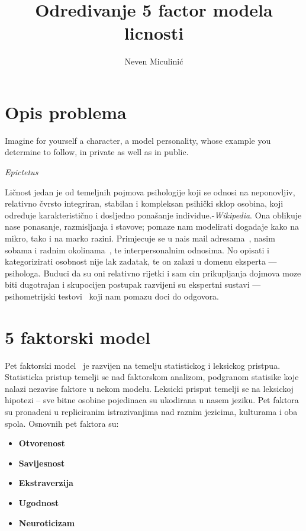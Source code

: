 \documentclass[times, utf8, seminar]{fer}
\begin{document}
\theoremstyle{definition}
\newtheorem{definition}{Definition}[section]

\title{Odredivanje 5 factor modela licnosti}
\author{Neven Miculinić}

\maketitle
\tableofcontents

\chapter{Opis problema}

\epigraph{Imagine for yourself a character, a model personality, whose example you determine to follow, in private as well as in public.
}{\textit{Epictetus}}
Ličnost jedan je od temeljnih pojmova psihologije koji se odnosi na neponovljiv, relativno čvrsto integriran, stabilan i kompleksan psihički sklop osobina, koji određuje karakteristično i dosljedno ponašanje individue.-\textit{Wikipedia}.
Ona oblikuje nase ponasanje, razmisljanja i stavove; pomaze nam modelirati dogadaje kako na mikro, tako i na marko razini. Primjecuje se u nais mail adresama~\cite{mail-personality}, nasim sobama i radnim okolinama~\cite{gosling2002room}, te interpersonalnim odnosima.
No opisati i kategorizirati osobnost nije lak zadatak, te on zalazi u domenu eksperta --- psihologa.
Buduci da su oni relativno rijetki i sam cin prikupljanja dojmova moze biti dugotrajan i skupocijen postupak razvijeni su ekspertni sustavi --- psihometrijski testovi~\cite{cronbach1949essentials} koji nam pomazu doci do odgovora.

\chapter{5 faktorski model}

Pet faktorski model~\cite{mccrae1992introduction} je razvijen na temelju statistickog i leksickog pristpua. Statisticka pristup temelji se nad faktorskom analizom, podgranom statisike koje nalazi nezavise faktore u nekom modelu. Leksicki prisput temelji se na leksickoj hipotezi -- sve bitne osobine pojedinaca su ukodirana u nasem jeziku. Pet faktora su pronadeni u repliciranim istrazivanjima nad raznim jezicima, kulturama i oba spola. Osnovnih pet faktora su:

\begin{itemize}
    \item \textbf{Otvorenost}
    \item \textbf{Savijesnost}
    \item \textbf{Ekstraverzija}
    \item \textbf{Ugodnost}
    \item \textbf{Neuroticizam}
\end{itemize}
\end{document}

